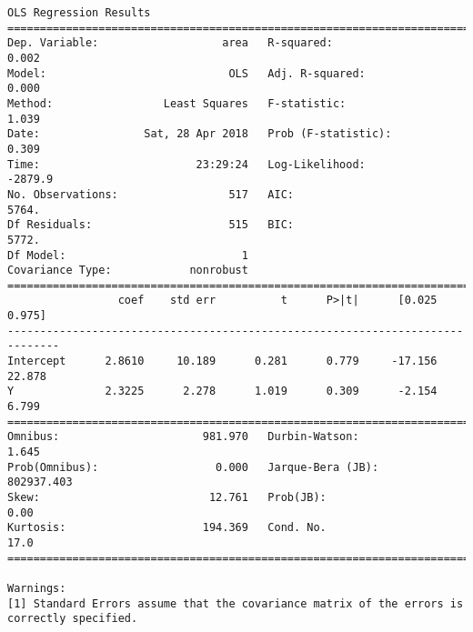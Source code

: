 \documentclass[11pt]{article}
\begin{document}
\begin{Verbatim}[commandchars=\\\{\}]
                            OLS Regression Results                            
==============================================================================
Dep. Variable:                   area   R-squared:                       0.002
Model:                            OLS   Adj. R-squared:                  0.000
Method:                 Least Squares   F-statistic:                     1.039
Date:                Sat, 28 Apr 2018   Prob (F-statistic):              0.309
Time:                        23:29:24   Log-Likelihood:                -2879.9
No. Observations:                 517   AIC:                             5764.
Df Residuals:                     515   BIC:                             5772.
Df Model:                           1                                         
Covariance Type:            nonrobust                                         
==============================================================================
                 coef    std err          t      P>|t|      [0.025      0.975]
------------------------------------------------------------------------------
Intercept      2.8610     10.189      0.281      0.779     -17.156      22.878
Y              2.3225      2.278      1.019      0.309      -2.154       6.799
==============================================================================
Omnibus:                      981.970   Durbin-Watson:                   1.645
Prob(Omnibus):                  0.000   Jarque-Bera (JB):           802937.403
Skew:                          12.761   Prob(JB):                         0.00
Kurtosis:                     194.369   Cond. No.                         17.0
==============================================================================

Warnings:
[1] Standard Errors assume that the covariance matrix of the errors is correctly specified.



\end{Verbatim}
\end{document}
